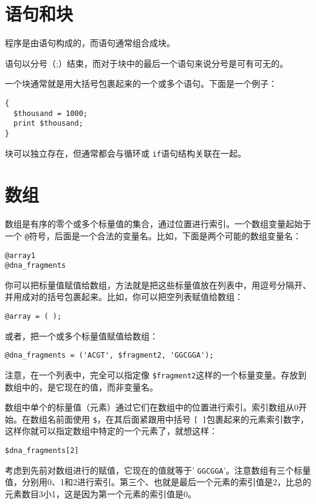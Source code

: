 \section{语句和块}
程序是由语句构成的，而语句通常组合成块。

语句以分号（;）结束，而对于块中的最后一个语句来说分号是可有可无的。

一个块通常就是用大括号包裹起来的一个或多个语句。下面是一个例子：

\begin{lstlisting}
{
  $thousand = 1000;
  print $thousand;
}
\end{lstlisting}

块可以独立存在，但通常都会与循环或 \verb|if|语句结构关联在一起。

\section{数组}
数组是有序的零个或多个标量值的集合，通过位置进行索引。一个数组变量起始于一个 \verb|@|符号，后面是一个合法的变量名。比如，下面是两个可能的数组变量名：

\begin{lstlisting}
@array1
@dna_fragments
\end{lstlisting}

你可以把标量值赋值给数组，方法就是把这些标量值放在列表中，用逗号分隔开、并用成对的括号包裹起来。比如，你可以把空列表赋值给数组：

\begin{lstlisting}
@array = ( );
\end{lstlisting}

或者，把一个或多个标量值赋值给数组：

\begin{lstlisting}
@dna_fragments = ('ACGT', $fragment2, 'GGCGGA');
\end{lstlisting}

注意，在一个列表中，完全可以指定像 \verb|$fragment2|这样的一个标量变量。存放到数组中的，是它现在的值，而非变量名。

数组中单个的标量值（元素）通过它们在数组中的位置进行索引。索引数组从0开始。在数组名前面使用 \verb|$|，在其后面紧跟用中括号 \verb|[ ]|包裹起来的元素索引数字，这样你就可以指定数组中特定的一个元素了，就想这样：

\begin{lstlisting}
$dna_fragments[2]
\end{lstlisting}

考虑到先前对数组进行的赋值，它现在的值就等于' \verb|GGCGGA|'。注意数组有三个标量值，分别用0、1和2进行索引。第三个、也就是最后一个元素的索引值是2，比总的元素数目3小1，这是因为第一个元素的索引值是0。

